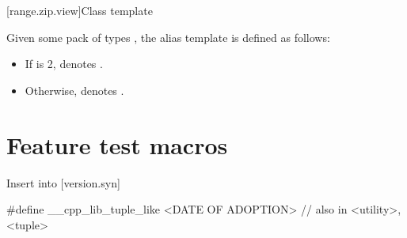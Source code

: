 \documentclass{wg21}
\begin{document}
[range.zip.view]{Class template }


\begin{removedblock}
\pnum
Given some pack of types ,
the alias template  is defined as follows:
\begin{itemize}
    \item
    If  is 2,
     denotes .
    \item
    Otherwise,  denotes .
\end{itemize}
\end{removedblock}



\section{Feature test macros}

Insert into [version.syn]

\begin{addedblock}
\begin{codeblock}
#define __cpp_lib_tuple_like <DATE OF ADOPTION> // also in <utility>, <tuple>
\end{codeblock}
\end{addedblock}
\end{document}
